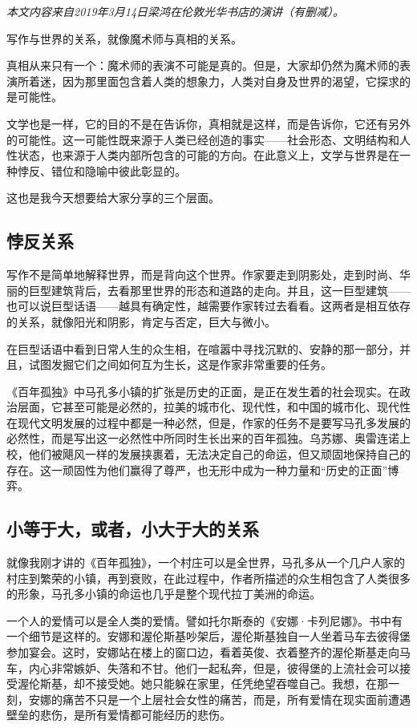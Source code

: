 \documentclass[12pt,a5paper]{ctexbook}
\begin{document}
\emph{本文内容来自2019年3月14日梁鸿在伦敦光华书店的演讲（有删减）。}
\vspace{2em}

写作与世界的关系，就像魔术师与真相的关系。

真相从来只有一个：魔术师的表演不可能是真的。但是，大家却仍然为魔术师的表演所着迷，因为那里面包含着人类的想象力，人类对自身及世界的渴望，它探求的是可能性。

文学也是一样，它的目的不是在告诉你，真相就是这样，而是告诉你，它还有另外的可能性。这一可能性既来源于人类已经创造的事实——社会形态、文明结构和人性状态，也来源于人类内部所包含的可能的方向。在此意义上，文学与世界是在一种悖反、错位和隐喻中彼此彰显的。

这也是我今天想要给大家分享的三个层面。

\subsection{悖反关系}
写作不是简单地解释世界，而是背向这个世界。作家要走到阴影处，走到时尚、华丽的巨型建筑背后，去看那里世界的形态和道路的走向。并且，这一巨型建筑——也可以说巨型话语——越具有确定性，越需要作家转过去看看。这两者是相互依存的关系，就像阳光和阴影，肯定与否定，巨大与微小。

在巨型话语中看到日常人生的众生相，在喧嚣中寻找沉默的、安静的那一部分，并且，试图发掘它们之间如何互为生长，这是作家非常重要的任务。

《百年孤独》中马孔多小镇的扩张是历史的正面，是正在发生着的社会现实。在政治层面，它甚至可能是必然的，拉美的城市化、现代性，和中国的城市化、现代性在现代文明发展的过程中都是一种必然，但是，作家的任务不是要写马孔多发展的必然性，而是写出这一必然性中所同时生长出来的百年孤独。乌苏娜、奥雷连诺上校，他们被飓风一样的发展挟裹着，无法决定自己的命运，但又顽固地保持自己的存在。这一顽固性为他们赢得了尊严，也无形中成为一种力量和“历史的正面”博弈。

\subsection{小等于大，或者，小大于大的关系}
就像我刚才讲的《百年孤独》，一个村庄可以是全世界，马孔多从一个几户人家的村庄到繁荣的小镇，再到衰败，在此过程中，作者所描述的众生相包含了人类很多的形象，马孔多小镇的命运也几乎是整个现代拉丁美洲的命运。

一个人的爱情可以是全人类的爱情。譬如托尔斯泰的《安娜·卡列尼娜》。书中有一个细节是这样的。安娜和渥伦斯基吵架后，渥伦斯基独自一人坐着马车去彼得堡参加宴会。这时，安娜站在楼上的窗口边，看着英俊、衣着整齐的渥伦斯基走向马车，内心非常嫉妒、失落和不甘。他们一起私奔，但是，彼得堡的上流社会可以接受渥伦斯基，却不接受她。她只能躲在家里，任凭绝望吞噬自己。我想，在那一刻，安娜的痛苦不只是一个上层社会女性的痛苦，而是，所有爱情在现实面前遭遇壁垒的悲伤，是所有爱情都可能经历的悲伤。
\end{document}
